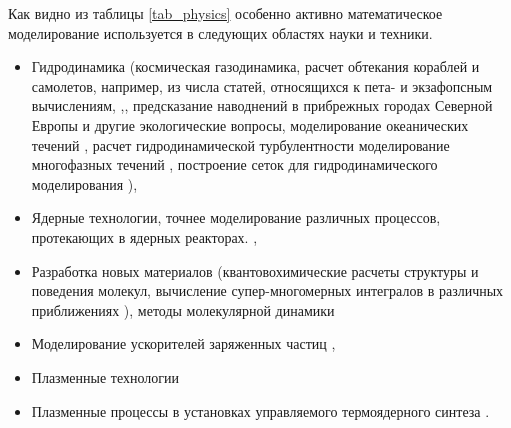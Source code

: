 Как видно из таблицы \ref{tab_physics} особенно активно математическое моделирование используется в следующих областях науки и техники.  
\begin{itemize}
	\item Гидродинамика (космическая газодинамика, расчет обтекания кораблей и самолетов, например, из числа статей, относящихся к пета- и экзафопсным вычислениям, \cite{Onishi2014},\cite{Lu2015,Peterson1989}, предсказание наводнений в прибрежных городах Северной Европы и другие экологические вопросы, моделирование океанических течений \cite{STERN20151,Newman20152086,Reuter2015325,Walker2014287}, расчет гидродинамической турбулентности %
	\cite{Mininni2011316,Appeloe201019,Yokota2013445,Tucker2016,Kotov2016189}  моделирование многофазных течений \cite{Safi2016170,Zaspel2016505}, построение сеток для гидродинамического моделирования \cite{Shang2013381,Yilmaz2013388,Ono20142336,Yilmaz2013773}),
	\item Ядерные технологии, точнее моделирование различных процессов, протекающих в ядерных реакторах. \cite{Romano2013274,Romano201320,Romano201590,Boyd201443,Gong2012588,Gong20116010,Bergmann2015176,Bauge201432}, 
	\item Разработка новых материалов (квантовохимические расчеты структуры и поведения молекул, вычисление супер-многомерных интегралов в различных приближениях \cite{Ono2015}), методы молекулярной динамики \cite{Valiev20101477,Aguilar20132197,Yokota201317,Ohno20142575,Xu2015200}
	\item Моделирование ускорителей заряженных частиц \cite{Silva2014229}, 
	\item Плазменные технологии\cite{BirdsallIEEE}
	\item Плазменные процессы в установках управляемого термоядерного синтеза
	\cite{KatesHarbeck2016231,Winkel2015456,Minoshima201381,Kumar20132251,Decyk2014,Acebron2013224}. 
	
\end{itemize}

